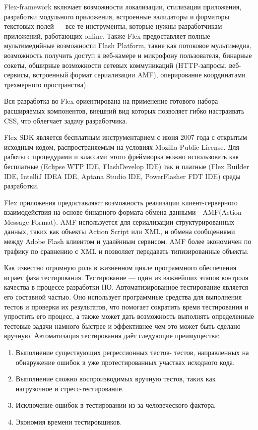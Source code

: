 Flex-framework включает возможности локализации, стилизации приложения, разработки модульного приложения, 
встроенные валидаторы и форматоры текстовых полей — все те инструменты, которые нужны разработчикам 
приложений, работающих online. Также Flex предоставляет полные мультимедийные возможности Flash 
Platform, такие как потоковое мультимедиа,  возможность получить доступ к веб-камере и микрофону 
пользователя, бинарные сокеты, обширные возможности сетевых коммуникаций (HTTP-запросы, веб-сервисы, 
встроенный формат сериализации AMF), оперирование координатами трехмерного пространства).

Вся разработка во Flex  ориентирована на применение готового набора
расширяемых компонентов,  внешний вид которых позволяет гибко
настраивать CSS, что облегчает задачу разработчика. 

Flex SDK  является бесплатным инструментарием с июня 2007 
года с открытым исходным кодом,  распространяемым на условиях Mozilla Public License.  
Для работы с процедурами и классами этого фреймворка можно использовать как бесплатные 
(Eclipse WTP IDE, FlashDevelop IDE) так и платные (Flex Builder IDE, IntelliJ IDEA IDE, 
Aptana Studio IDE, PowerFlasher FDT IDE) среды разработки.

Flex приложения предоставляют возможность реализации клиент-серверного взаимодействия 
на основе бинарного формата обмена данными - AMF(Action Message Format). AMF 
используется для сериализации структурированных данных, таких как объекты Action Script 
или XML, и обмена сообщениями между Adobe Flash клиентом и удалённым сервисом. 
AMF более экономичен по трафику по сравнению с XML и позволяет передавать типизированные объекты.

Как известно огромную роль в жизненном цикле программного обеспечения играет  фаза тестирования.
Тестирование — один из важнейших этапов контроля качества в процессе 
разработки ПО. Автоматизированное тестирование 
является его составной частью. Оно использует программные средства для 
выполнения тестов и проверки их результатов, что помогает сократить 
время тестирования и упростить его процесс, а также может 
дать возможность выполнять определенные тестовые задачи намного быстрее и 
эффективнее чем это может быть сделано вручную. Автоматизация тестирования 
даёт следующие преимущества: 

\begin{enumerate}
\item Выполнение существующих регрессионных тестов- тестов, направленных 
на обнаружение ошибок в уже протестированных участках исходного кода.
\item Выполнение сложно воспроизводимых вручную тестов, таких как нагрузочное 
и стресс-тестирование. 
\item Исключение ошибок в тестировании из-за человеческого фактора.
\item Экономия времени тестировщиков.
\end{enumerate}

